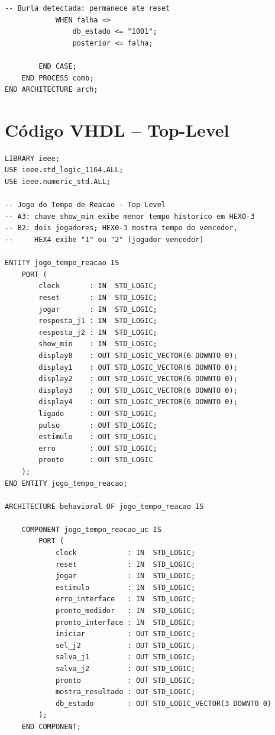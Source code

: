 \documentclass[12pt,a4paper]{article}
\begin{document}
\begin{lstlisting}[caption={Unidade de Controle -- \texttt{jogo\_tempo\_reacao\_uc.vhd}},
                   label={lst:uc}]
            -- Burla detectada: permanece ate reset
            WHEN falha =>
                db_estado <= "1001";
                posterior <= falha;

        END CASE;
    END PROCESS comb;
END ARCHITECTURE arch;
\end{lstlisting}

\section{Código VHDL -- Top-Level}

\begin{lstlisting}[caption={Top-Level -- \texttt{jogo\_tempo\_reacao.vhd}},
                   label={lst:top}]
LIBRARY ieee;
USE ieee.std_logic_1164.ALL;
USE ieee.numeric_std.ALL;

-- Jogo do Tempo de Reacao - Top Level
-- A3: chave show_min exibe menor tempo historico em HEX0-3
-- B2: dois jogadores; HEX0-3 mostra tempo do vencedor,
--     HEX4 exibe "1" ou "2" (jogador vencedor)

ENTITY jogo_tempo_reacao IS
    PORT (
        clock       : IN  STD_LOGIC;
        reset       : IN  STD_LOGIC;
        jogar       : IN  STD_LOGIC;
        resposta_j1 : IN  STD_LOGIC;
        resposta_j2 : IN  STD_LOGIC;
        show_min    : IN  STD_LOGIC;
        display0    : OUT STD_LOGIC_VECTOR(6 DOWNTO 0);
        display1    : OUT STD_LOGIC_VECTOR(6 DOWNTO 0);
        display2    : OUT STD_LOGIC_VECTOR(6 DOWNTO 0);
        display3    : OUT STD_LOGIC_VECTOR(6 DOWNTO 0);
        display4    : OUT STD_LOGIC_VECTOR(6 DOWNTO 0);
        ligado      : OUT STD_LOGIC;
        pulso       : OUT STD_LOGIC;
        estimulo    : OUT STD_LOGIC;
        erro        : OUT STD_LOGIC;
        pronto      : OUT STD_LOGIC
    );
END ENTITY jogo_tempo_reacao;

ARCHITECTURE behavioral OF jogo_tempo_reacao IS

    COMPONENT jogo_tempo_reacao_uc IS
        PORT (
            clock            : IN  STD_LOGIC;
            reset            : IN  STD_LOGIC;
            jogar            : IN  STD_LOGIC;
            estimulo         : IN  STD_LOGIC;
            erro_interface   : IN  STD_LOGIC;
            pronto_medidor   : IN  STD_LOGIC;
            pronto_interface : IN  STD_LOGIC;
            iniciar          : OUT STD_LOGIC;
            sel_j2           : OUT STD_LOGIC;
            salva_j1         : OUT STD_LOGIC;
            salva_j2         : OUT STD_LOGIC;
            pronto           : OUT STD_LOGIC;
            mostra_resultado : OUT STD_LOGIC;
            db_estado        : OUT STD_LOGIC_VECTOR(3 DOWNTO 0)
        );
    END COMPONENT;


\end{lstlisting}
\end{document}
